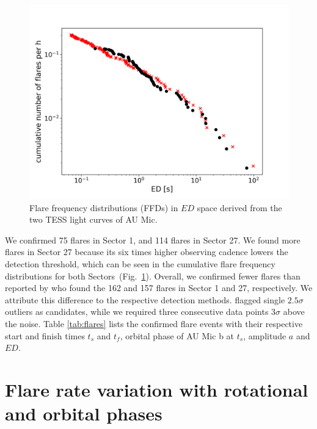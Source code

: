 \documentclass[fleqn,usenatbib,letters]{mnras}%
\begin{document}
\begin{figure}
\includegraphics[width=\hsize]{figures/2021_06_11_ffd.png} 
\caption{Flare frequency distributions (FFDs) in $ED$ space derived from the two TESS light curves of AU Mic.}
\label{fig:ffd}
\end{figure}
We confirmed 75 flares in Sector 1, and 114 flares in Sector 27. We found more flares in Sector 27 because its six times higher observing cadence lowers the detection threshold, which can be seen in the cumulative flare frequency distributions for both Sectors~(Fig.~\ref{fig:ffd}). Overall, we confirmed fewer flares than reported by \citet{martioli2021} who found the 162 and 157 flares in Sector 1 and 27, respectively. We attribute this difference to the respective detection methods. \citet{martioli2021} flagged single $2.5\sigma$ outliers as candidates, while we required three consecutive data points $3\sigma$ above the noise. Table \ref{tab:flares} lists the confirmed flare events with their respective start and finish times $t_s$ and $t_f$, orbital phase of AU Mic b at $t_s$, amplitude $a$ and $ED$.

\section{Flare rate variation with rotational and orbital phases}
\label{sec:phases}
\end{document}
